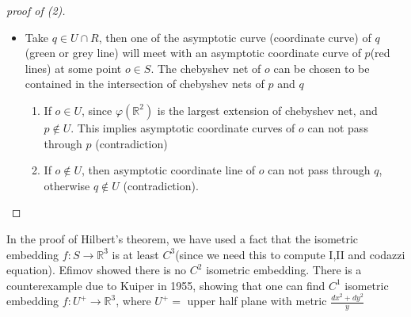 \begin{proof}[proof of (2)]
\begin{enumerate}[(1)]
\begin{itemize}
        \item Take \(q\in U\cap R\), then one of the asymptotic curve
        (coordinate curve) of \(q\) (green or grey line) will meet with
        an asymptotic coordinate curve of \(p\)(red lines) at some point
        \(o \in S\). The chebyshev net of \(o\) can be chosen to be contained
        in the intersection of chebyshev nets of \(p\) and \(q\)
        \begin{enumerate}[(1)]
            \item If \(o\in U\), since \(\varphi(\mathbb{R}^2)\)
            is the largest extension of chebyshev net, and \(p\notin U\).
            This implies asymptotic coordinate curves of \(o\)
            can not pass through \(p\) (contradiction)
            \item If \(o\notin U\), then asymptotic coordinate line 
            of \(o\) can not pass through \(q\), otherwise \(q\notin U\)
            (contradiction).
        \end{enumerate}
    \end{itemize}
    \end{enumerate}
\end{proof}
\begin{remark}
    In the proof of Hilbert's theorem, we have used a fact that
    the isometric embedding \(f\colon S\to \mathbb{R}^3\) is at least
    \(C^3\)(since we need this to compute I,II and codazzi equation).
    Efimov showed there is no \(C^2\) isometric embedding.
    There is a counterexample due to Kuiper in 1955, showing that
    one can find \(C^1\) isometric embedding \(f\colon U^+\to
    \mathbb{R}^3\), where \(U^+=\) upper half plane with metric
    \(\frac{dx^2+dy^2}{y}\)
\end{remark}
